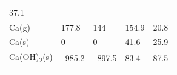 \documentclass[
  9pt,
]{extbook}
\theoremstyle{definition}
\theoremstyle{definition}
\theoremstyle{definition}
\theoremstyle{remark}
\begin{document}
\begin{longtable}[]{@{}lllll@{}}
\begin{minipage}[t]{0.18\columnwidth}
37.1\strut
\end{minipage}\tabularnewline
\begin{minipage}[t]{0.10\columnwidth}\raggedright
Ca(g)\strut
\end{minipage} & \begin{minipage}[t]{0.19\columnwidth}\raggedright
177.8\strut
\end{minipage} & \begin{minipage}[t]{0.20\columnwidth}\raggedright
144\strut
\end{minipage} & \begin{minipage}[t]{0.18\columnwidth}\raggedright
154.9\strut
\end{minipage} & \begin{minipage}[t]{0.18\columnwidth}\raggedright
20.8\strut
\end{minipage}\tabularnewline
\begin{minipage}[t]{0.10\columnwidth}\raggedright
Ca(s)\strut
\end{minipage} & \begin{minipage}[t]{0.19\columnwidth}\raggedright
0\strut
\end{minipage} & \begin{minipage}[t]{0.20\columnwidth}\raggedright
0\strut
\end{minipage} & \begin{minipage}[t]{0.18\columnwidth}\raggedright
41.6\strut
\end{minipage} & \begin{minipage}[t]{0.18\columnwidth}\raggedright
25.9\strut
\end{minipage}\tabularnewline
\begin{minipage}[t]{0.10\columnwidth}\raggedright
Ca(OH)\textsubscript{2}(s)\strut
\end{minipage} & \begin{minipage}[t]{0.19\columnwidth}\raggedright
--985.2\strut
\end{minipage} & \begin{minipage}[t]{0.20\columnwidth}\raggedright
--897.5\strut
\end{minipage} & \begin{minipage}[t]{0.18\columnwidth}\raggedright
83.4\strut
\end{minipage} & \begin{minipage}[t]{0.18\columnwidth}\raggedright
87.5\strut
\end{minipage}\tabularnewline
\begin{minipage}[t]{0.10\columnwidth}\raggedright

\end{minipage}
\end{longtable}
\end{document}
